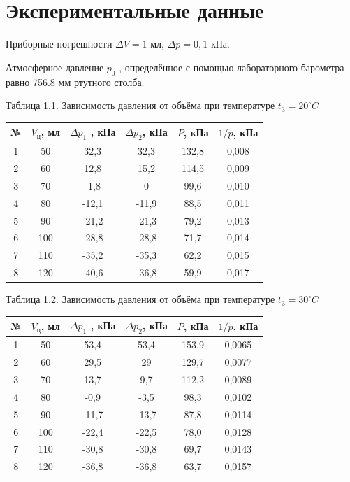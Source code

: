 \documentclass[12pt]{article}
\begin{document}
\section*{Экспериментальные данные}
Приборные погрешности $\Delta V = 1$ мл, $\Delta p = 0,1$ кПа.

Атмосферное давление $p_{0}$ , определённое с помощью лабораторного барометра равно 756.8 мм ртутного столба.
\begin{table}[h!]
\begin{center}
Таблица 1.1. Зависимость давления от объёма при температуре  $t_{3}=20^{\circ} C$

\begin{tabular}{|c|c|c|c|c|c|}
\hline
№ &	$V_{ц}$, мл	&$\Delta p_{1}$ , кПа	&$\Delta p_{2}$, кПа	&$P$, кПа&	$1/p$, кПа \\
\hline
1&		50&		32,3	&	32,3&		132,8&		0,008\\
\hline
2&	        60&		12,8&		15,2&		114,5	&	0,009\\
\hline
3&		70&		-1,8&		0&		99,6	&	0,010\\
\hline
4&		80&		-12,1&		-11,9	&	88,5	&	0,011\\
\hline
5&		90&		-21,2&		-21,3&		79,2&		0,013\\
\hline
6&		100&		-28,8&		-28,8	&	71,7	&	0,014\\
\hline
7&		110&		-35,2&		-35,3	&	62,2	&	0,015\\
\hline
8	&	120	&	-40,6	&	-36,8&		59,9&		0,017\\
\hline
\end{tabular}
\end{center}
\end{table} 
\begin{table}[h!]
\begin{center}
Таблица 1.2. Зависимость давления от объёма при температуре $t_{3}=30^{\circ} C$
\begin{tabular}{|c|c|c|c|c|c|}
\hline
№ &	$V_{ц}$, мл	&$\Delta p_{1}$ , кПа	&$\Delta p_{2}$, кПа	&$P$, кПа&	$1/p$, кПа \\
\hline
1&		50&		53,4&		53,4&		153,9	&	0,0065\\
\hline
2	&	60	&	29,5&		29&		129,7&		0,0077\\
\hline
3&		70	&	13,7&		9,7	&	112,2&		0,0089\\
\hline
4&		80	&	-0,9&		-3,5&		98,3&		0,0102\\
\hline
5	&	90	&	-11,7&		-13,7&		87,8&		0,0114\\
\hline
6&		100&		-22,4&		-22,5&		78,0&		0,0128\\
\hline
7	&	110&		-30,8&		-30,8	&	69,7&		0,0143\\
\hline
8&		120&		-36,8	&	-36,8	&	63,7	&	0,0157\\
\hline
\end{tabular}
\end{center}
\end{table} 
\end{document}
